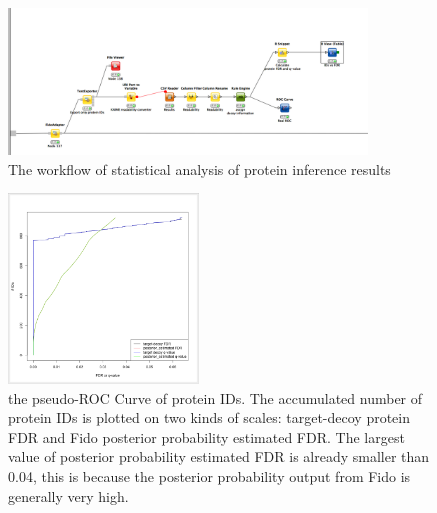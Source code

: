 \begin{figure}[htbp]
  \centering
  \includegraphics[width=0.85\textwidth]{graphics/protein_inference/ProteinInferenceKNIME_workflow.pdf}
  \caption{The workflow of statistical analysis of protein inference results}
  \label{fig:proteininference}
\end{figure}

\begin{figure}[htbp]
  \centering
  \includegraphics[width=0.45\textwidth]{graphics/protein_inference/proteinFDR.png}
  \caption{the pseudo-ROC Curve of protein IDs. The accumulated number of protein IDs is plotted on two kinds of scales: target-decoy protein FDR and Fido posterior probability estimated FDR. The largest value of posterior probability estimated FDR is already smaller than 0.04, this is because the posterior probability output from Fido is generally very high.}
  \label{fig:proteinfdr}
\end{figure}
